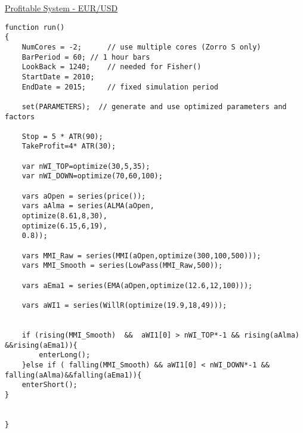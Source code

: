 \href{http://www.opserver.de/ubb7/ubbthreads.php?ubb=showflat&Number=460866#Post460866}{Profitable System  - EUR/USD}
\begin{lstlisting}[caption=Profitable System]
function run()
{
	NumCores = -2;		// use multiple cores (Zorro S only)
	BarPeriod = 60;	// 1 hour bars
	LookBack = 1240;	// needed for Fisher()
	StartDate = 2010;
	EndDate = 2015; 	// fixed simulation period
	
	set(PARAMETERS);  // generate and use optimized parameters and factors
	
	Stop = 5 * ATR(90);
	TakeProfit=4* ATR(30);	
	
	var nWI_TOP=optimize(30,5,35);
	var nWI_DOWN=optimize(70,60,100);
	
	vars aOpen = series(price());
	vars aAlma = series(ALMA(aOpen,
	optimize(8.61,8,30),
	optimize(6.15,6,19),
	0.8));
	
	vars MMI_Raw = series(MMI(aOpen,optimize(300,100,500)));
	vars MMI_Smooth = series(LowPass(MMI_Raw,500));
	
	vars aEma1 = series(EMA(aOpen,optimize(12.6,12,100)));
	
	vars aWI1 = series(WillR(optimize(19.9,18,49)));
	
	
	if (rising(MMI_Smooth)  &&  aWI1[0] > nWI_TOP*-1 && rising(aAlma) &&rising(aEma1)){
		enterLong();
	}else if ( falling(MMI_Smooth) && aWI1[0] < nWI_DOWN*-1 && falling(aAlma)&&falling(aEma1)){
	enterShort();
}


}
\end{lstlisting}


